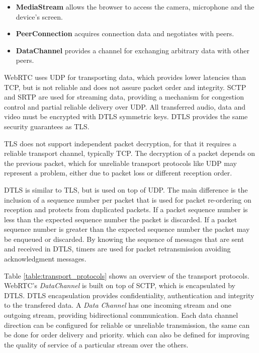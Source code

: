 \begin{itemize}
  \item \textbf{MediaStream} allows the browser to access the camera, microphone and the device's screen. 

  \item \textbf{PeerConnection} acquires connection data and negotiates with peers.

  \item \textbf{DataChannel} provides a channel for exchanging arbitrary data with other peers.
\end{itemize}

\ac{WebRTC} uses \ac{UDP} for transporting data, which provides lower latencies than \ac{TCP}, but is not reliable and does not assure packet order and integrity. \ac{SCTP} and \ac{SRTP} are used for streaming data, providing a mechanism for congestion control and partial reliable delivery over \ac{UDP}. All transferred audio, data and video must be encrypted with \ac{DTLS} symmetric keys. \ac{DTLS} provides the same security guarantees as \ac{TLS}. 

\ac{TLS} does not support independent packet decryption\cite{rfc6347}, for that it requires a reliable transport channel, typically \ac{TCP}. The decryption of a packet depends on the previous packet, which for unreliable transport protocols like \ac{UDP} may represent a problem, either due to packet loss or different reception order.

\ac{DTLS} is similar to \ac{TLS}, but is used on top of \ac{UDP}.
The main difference is the inclusion of a sequence number per packet that is used for packet re-ordering on reception and protects from duplicated packets. If a packet sequence number is less than the expected sequence number the packet is discarded. If a packet sequence number is greater than the expected sequence number the packet may be enqueued or discarded. By knowing the sequence of messages that are sent and received in \ac{DTLS}, timers are used for packet retransmission avoiding acknowledgment messages.

Table \ref{table:transport_protocols} shows an overview of the transport protocols.
\ac{WebRTC}'s \emph{DataChannel} is built on top of \ac{SCTP}, which is encapsulated by \ac{DTLS}. \ac{DTLS} encapsulation provides confidentiality, authentication and integrity to the transfered data. A \emph{Data Channel} has one incoming stream and one outgoing stream, providing bidirectional communication. Each data channel direction can be configured for reliable or unreliable transmission, the same can be done for order delivery and priority. which can also be defined for improving the quality of service of a particular stream over the others.

